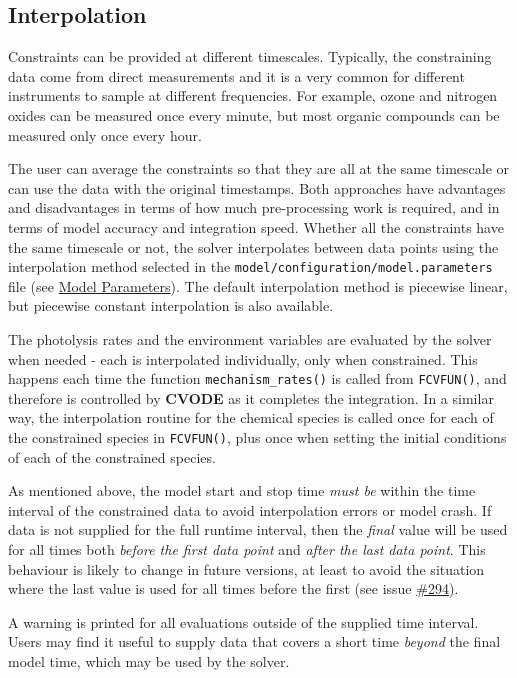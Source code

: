 \subsection{Interpolation} \label{subsec:interpolation}

Constraints can be provided at different timescales. Typically, the
constraining data come from direct measurements and it is a very
common for different instruments to sample at different
frequencies. For example, ozone and nitrogen oxides can be measured
once every minute, but most organic compounds can be measured only
once every hour.

The user can average the constraints so that they are all at the same
timescale or can use the data with the original timestamps. Both
approaches have advantages and disadvantages in terms of how much
pre-processing work is required, and in terms of model accuracy and
integration speed. Whether all the constraints have the same timescale
or not, the solver interpolates between data points using the
interpolation method selected in the
\texttt{model/configuration/model.parameters} file (see
\hyperref[sec:parameters]{Model Parameters}). The default
interpolation method is piecewise linear, but piecewise constant
interpolation is also available.

The photolysis rates and the environment variables are evaluated by
the solver when needed - each is interpolated individually, only when
constrained. This happens each time the function
\texttt{mechanism\_rates()} is called from \texttt{FCVFUN()}, and
therefore is controlled by \textbf{CVODE} as it completes the
integration. In a similar way, the interpolation routine for the
chemical species is called once for each of the constrained species in
\texttt{FCVFUN()}, plus once when setting the initial conditions of
each of the constrained species.

As mentioned above, the model start and stop time \emph{must be}
within the time interval of the constrained data to avoid
interpolation errors or model crash. If data is not supplied for the
full runtime interval, then the \emph{final} value will be used for
all times both \emph{before the first data point} and \emph{after the
  last data point}. This behaviour is likely to change in future
versions, at least to avoid the situation where the last value is used
for all times before the first (see issue
\href{https://github.com/AtChem/AtChem2/issues/294}{\#294}).

A warning is printed for all evaluations outside of the supplied time
interval. Users may find it useful to supply data that covers a short
time \emph{beyond} the final model time, which may be used by the
solver.

